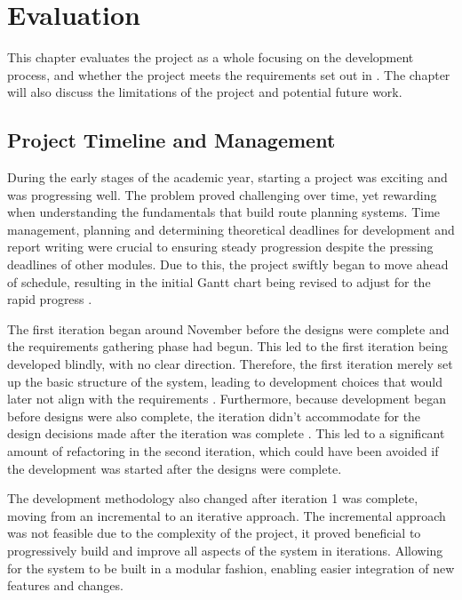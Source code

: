 \chapter{Evaluation}
\label{chap:evaluation}

This chapter evaluates the project as a whole focusing on the development process, and whether the project meets the requirements set out in . The chapter will also discuss the limitations of the project and potential future work.

\section{Project Timeline and Management}
\label{evaluation:timeline-management}

During the early stages of the academic year, starting a project was exciting and was progressing well. The problem proved challenging over time, yet rewarding when understanding the fundamentals that build route planning systems. Time management, planning and determining theoretical deadlines for development and report writing were crucial to ensuring steady progression despite the pressing deadlines of other modules. Due to this, the project swiftly began to move ahead of schedule, resulting in the initial Gantt chart  being revised to adjust for the rapid progress .

The first iteration began around November before the designs were complete and the requirements gathering phase had begun. This led to the first iteration being developed blindly, with no clear direction. Therefore, the first iteration merely set up the basic structure of the system, leading to development choices that would later not align with the requirements . Furthermore, because development began before designs were also complete, the iteration didn't accommodate for the design decisions made after the iteration was complete . This led to a significant amount of refactoring in the second iteration, which could have been avoided if the development was started after the designs were complete.

The development methodology also changed after iteration 1 was complete, moving from an incremental to an iterative approach. The incremental approach was not feasible due to the complexity of the project, it proved beneficial to progressively build and improve all aspects of the system in iterations. Allowing for the system to be built in a modular fashion, enabling easier integration of new features and changes.

